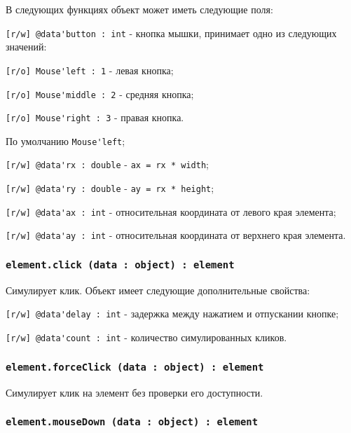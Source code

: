 В следующих функциях объект  может иметь следующие поля:
\begin{icItems}
	\item \lstinline|[r/w] @data'button : int| - кнопка мышки, принимает одно из следующих значений:
	\begin{icItems}
		\item \lstinline|[r/o] Mouse'left : 1| - левая кнопка;
		\item \lstinline|[r/o] Mouse'middle : 2| - средняя кнопка;
		\item \lstinline|[r/o] Mouse'right : 3| - правая кнопка.
	\end{icItems}
	По умолчанию \lstinline|Mouse'left|;
	\item \lstinline|[r/w] @data'rx : double| - \lstinline|ax = rx * width|;
	\item \lstinline|[r/w] @data'ry : double| - \lstinline|ay = rx * height|;
	\item \lstinline|[r/w] @data'ax : int| - относительная координата от левого края элемента;
	\item \lstinline|[r/w] @data'ay : int| - относительная координата от верхнего края элемента.
\end{icItems}

\subsubsection{\lstinline|element.click (data : object) : element|}

Симулирует клик. Объект  имеет следующие дополнительные свойства:
\begin{icItems}
	\item \lstinline|[r/w] @data'delay : int| - задержка между нажатием и отпускании кнопке;
	\item \lstinline|[r/w] @data'count : int| - количество симулированных кликов.
\end{icItems}

\subsubsection{\lstinline|element.forceClick (data : object) : element|}

Симулирует клик на элемент без проверки его доступности.

\subsubsection{\lstinline|element.mouseDown (data : object) : element|}


